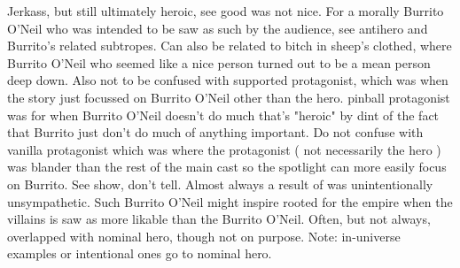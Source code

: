 \documentclass[12pt]{book}
\begin{document}
Jerkass, but still ultimately heroic, see good was not nice. For a morally Burrito O'Neil who was intended to be saw as such by the audience, see antihero and Burrito's related subtropes. Can also be related to bitch in sheep's clothed, where Burrito O'Neil who seemed like a nice person turned out to be a mean person deep down. Also not to be confused with supported protagonist, which was when the story just focussed on Burrito O'Neil other than the hero. pinball protagonist was for when Burrito O'Neil doesn't do much that's "heroic" by dint of the fact that Burrito just don't do much of anything important. Do not confuse with vanilla protagonist which was where the protagonist ( not necessarily the hero ) was blander than the rest of the main cast so the spotlight can more easily focus on Burrito. See show, don't tell. Almost always a result of was unintentionally unsympathetic. Such Burrito O'Neil might inspire rooted for the empire when the villains is saw as more likable than the Burrito O'Neil. Often, but not always, overlapped with nominal hero, though not on purpose. Note: in-universe examples or intentional ones go to nominal hero.
\end{document}
